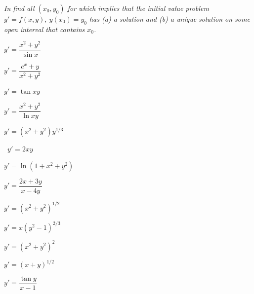 \noindent
\emph{In  find all $(x_0,y_0)$ for
which 
implies that the initial value problem $y'=f(x,y),\  y(x_0)=y_0$ has
(a) a solution and (b) a  unique solution on some open interval that
contains $x_0$.}

\begin{exerciselistTwoColumn}
\item\label{exer:2.3.1}$y'=\dfrac{x^2+y^2}{\sin x}$
\item\label{exer:2.3.2}$y'=\dfrac{e^x+y }{x^2+y^2}$
\item\label{exer:2.3.3}$y'= \tan xy$
\item\label{exer:2.3.4}$y'=\dfrac{x^2+y^2}{\ln xy}$
\item\label{exer:2.3.5}$y'=(x^2+y^2)y^{1/3}$
\item\label{exer:2.3.6}\ $y'=2xy$
\item\label{exer:2.3.7}$y'=\ln(1+x^2+y^2)$
\item\label{exer:2.3.8}$y'=\dfrac{2x+3y}{x-4y}$
\item\label{exer:2.3.9}$y'=(x^2+y^2)^{1/2}$
\item\label{exer:2.3.10}$y'=x(y^2-1)^{2/3}$
\item\label{exer:2.3.11}$y'=(x^2+y^2)^2$
\item\label{exer:2.3.12}$y'=(x+y)^{1/2}$
\item\label{exer:2.3.13}$y'=\dfrac{\tan y }{x-1}$
\end{exerciselistTwoColumn}

